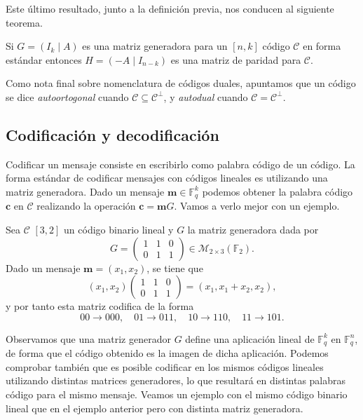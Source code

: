 Este último resultado, junto a la definición previa, nos conducen al siguiente teorema. 

\begin{theorem}
  Si \(G = (I_k \mid A)\) es una matriz generadora para un \([n, k]\) código \(\mathcal C\) en forma estándar entonces \(H = (-A \mid I_{n-k})\) es una matriz de paridad para \(\mathcal C\).
\end{theorem}

Como nota final sobre nomenclatura de códigos duales, apuntamos que un código se dice \textit{autoortogonal} cuando \(\mathcal C \subseteq \mathcal C^{\perp}\), y \textit{autodual} cuando \(\mathcal C = \mathcal C^{\perp}\).

\subsection{Codificación y decodificación}
\label{subsec:codificacion-descodificacion}

Codificar un mensaje consiste en escribirlo como palabra código de un código.
La forma estándar de codificar mensajes con códigos lineales es utilizando una matriz generadora.
Dado un mensaje \(\mathbf{m} \in \mathbb F_q^k\) podemos obtener la palabra código \(\mathbf{c}\) en \(\mathcal C\) realizando la operación \(\mathbf{c}= \mathbf{m}G\).
Vamos a verlo mejor con un ejemplo.

\begin{example}
  Sea \(\mathcal C\) \([3, 2]\) un código binario lineal y \(G\) la matriz generadora dada por 
  \[
    G = \begin{pmatrix}
      1 & 1 & 0 \\ 0 & 1 & 1
    \end{pmatrix} \in \mathcal M_{2 \times 3}(\mathbb F_2).
  \]
  Dado un mensaje \(\mathbf{m} = (x_1, x_2)\), se tiene que \[(x_1, x_2) \begin{pmatrix}
    1 & 1 & 0 \\ 0 & 1 & 1
  \end{pmatrix} = (x_1, x_1 + x_2, x_2),\] y por tanto esta matriz codifica de la forma \[00 \to 000, \quad 01 \to 011,\quad 10 \to 110,\quad 11 \to 101.\]
\end{example}

Observamos que una matriz generador \(G\) define una aplicación lineal de \(\mathbb F_q^k\) en \(\mathbb F_q^n\), de forma que el código obtenido es la imagen de dicha aplicación.
Podemos comprobar también que es posible codificar en los mismos códigos lineales utilizando distintas matrices generadores, lo que resultará en distintas palabras código para el mismo mensaje.
Veamos un ejemplo con el mismo código binario lineal que en el ejemplo anterior pero con distinta matriz generadora.

